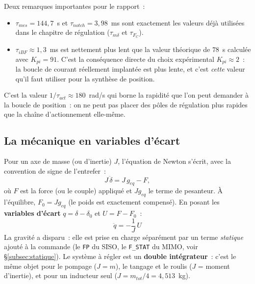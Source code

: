 \documentclass[a4paper,11pt]{article}
\newcommand{\qm}{q}
\begin{document}
Deux remarques importantes pour le rapport~:
\begin{itemize}
    \item $\tau_{mes} = 144{,}7$~\textmu s et $\tau_{notch} = 3{,}98$~ms sont
          exactement les valeurs déjà utilisées dans le chapitre de régulation
          ($\tau_{m\delta}$ et $\tau_{F_C}$).
    \item $\tau_{iBF} \approx 1{,}3$~ms est nettement plus lent que la valeur
          théorique de $78$~\textmu s calculée avec $K_{pi} = 91$. C'est la
          conséquence directe du choix expérimental $K_{pi} \approx 2$~: la
          boucle de courant réellement implantée est plus lente, et c'est
          \emph{cette} valeur qu'il faut utiliser pour la synthèse de position.
\end{itemize}

C'est la valeur $1/\tau_{act} \approx 180$~rad/s qui borne la rapidité que
l'on peut demander à la boucle de position~: on ne peut pas placer des pôles
de régulation plus rapides que la chaîne d'actionnement elle-même.

\subsection{La mécanique en variables d'écart}
\label{subsec:deviation}

Pour un axe de masse (ou d'inertie) $J$, l'équation de Newton s'écrit, avec la
convention de signe de l'entrefer~:
\begin{equation}
    J\,\ddot{\delta} = J\,g_{eq} - F,
\end{equation}
où $F$ est la force (ou le couple) appliqué et $J g_{eq}$ le terme de pesanteur.
À l'équilibre, $F_0 = J g_{eq}$ (le poids est exactement compensé). En posant
les \textbf{variables d'écart} $\qm = \delta - \delta_0$ et $U = F - F_0$~:
\begin{equation}
    \boxed{\;\ddot{\qm} = -\frac{1}{J}\,U\;}
    \label{eq:doubleint}
\end{equation}
La gravité a disparu~: elle est prise en charge séparément par un terme
\emph{statique} ajouté à la commande (le \texttt{FP} du SISO, le
\texttt{F\_STAT} du MIMO, voir §\ref{subsec:statique}). Le système à régler
est un \textbf{double intégrateur}~: c'est le même objet pour le pompage
($J = m$), le tangage et le roulis ($J$ = moment d'inertie), et pour un
inducteur seul ($J = m_{tot}/4 = 4{,}513$~kg).

\end{document}
